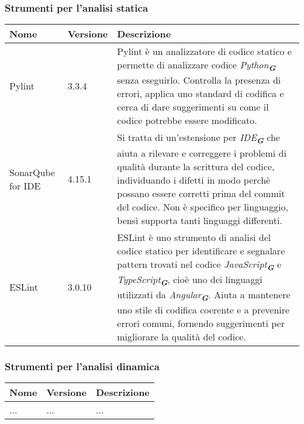 \subsubsection{Strumenti per l’analisi statica}
\label{subsec:strumenti_analisi_statica}
\begin{table}[h!]
    \centering
    \renewcommand{\arraystretch}{1.6} %
    \begin{tabularx}{\textwidth}{|p{2cm}|p{2cm}|X|} \hline
    \rowcolor[HTML]{FFD700} 
    \textbf{Nome} & \textbf{Versione} & \textbf{Descrizione} \\ \hline
    Pylint & 3.3.4 & Pylint è un analizzatore di codice statico e permette di
                    analizzare codice \emph{Python}\textsubscript{\textbf{\textit{G}}} senza eseguirlo. Controlla la presenza
                    di errori, applica uno standard di codifica e cerca di dare
                    suggerimenti su come il codice potrebbe essere modificato. \\ \hline
    SonarQube for IDE & 4.15.1 & Si tratta di un’estensione per \emph{IDE}\textsubscript{\textbf{\textit{G}}} 
                                che aiuta a rilevare
                                e correggere i problemi di qualità durante la scrittura
                                del codice, individuando i difetti in modo perchè possano
                                essere corretti prima del commit del codice. Non è specifico
                                per linguaggio, bensì supporta tanti linguaggi differenti. \\ \hline
    ESLint & 3.0.10 & ESLint è uno strumento di analisi del codice statico per identificare
                    e segnalare pattern trovati nel codice \emph{JavaScript}\textsubscript{\textbf{\textit{G}}}
                    e \emph{TypeScript}\textsubscript{\textbf{\textit{G}}}, cioè uno 
                    dei linguaggi utilizzati da \emph{Angular}\textsubscript{\textbf{\textit{G}}}. Aiuta a mantenere
                    uno stile di codifica
                    coerente e a prevenire errori comuni, fornendo suggerimenti per migliorare
                    la qualità del codice. \\ \hline
    \end{tabularx}
\end{table}

\subsubsection{Strumenti per l’analisi dinamica}
\begin{table}[h!]
    \centering
    \renewcommand{\arraystretch}{1.6} %
    \begin{tabularx}{\textwidth}{|p{2cm}|p{2cm}|X|} \hline
    \rowcolor[HTML]{FFD700} 
    \textbf{Nome} & \textbf{Versione} & \textbf{Descrizione} \\ \hline
    ... & ... & ... \\ \hline
    \end{tabularx}
\end{table}
